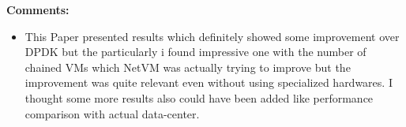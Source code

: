 \documentclass[a4paper,12pt, twoside]{article}
\begin{document}
\textbf{Comments:}
\begin{itemize}
	\item This Paper presented results which definitely showed some improvement over DPDK but the particularly i found impressive one with the number of chained VMs which NetVM was actually trying to improve but the improvement was quite relevant even without using specialized hardwares. I thought some more results also could have been added like performance comparison with actual data-center.    
\end{itemize}
\end{document}
